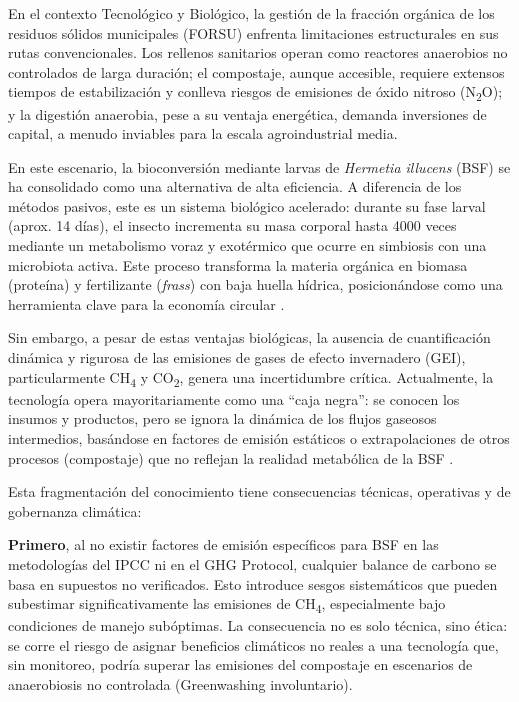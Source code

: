 En el contexto Tecnológico y Biológico, la gestión de la fracción orgánica de los residuos sólidos municipales (FORSU) enfrenta limitaciones estructurales en sus rutas convencionales. Los rellenos sanitarios operan como reactores anaerobios no controlados de larga duración; el compostaje, aunque accesible, requiere extensos tiempos de estabilización y conlleva riesgos de emisiones de óxido nitroso (N\textsubscript{2}O); y la digestión anaerobia, pese a su ventaja energética, demanda inversiones de capital, a menudo inviables para la escala agroindustrial media.

En este escenario, la bioconversión mediante larvas de \textit{Hermetia illucens} (BSF) se ha consolidado como una alternativa de alta eficiencia. A diferencia de los métodos pasivos, este es un sistema biológico acelerado: durante su fase larval (aprox. 14 días), el insecto incrementa su masa corporal hasta 4000 veces mediante un metabolismo voraz y exotérmico que ocurre en simbiosis con una microbiota activa. Este proceso transforma la materia orgánica en biomasa (proteína) y fertilizante (\textit{frass}) con baja huella hídrica, posicionándose como una herramienta clave para la economía circular \parencite{surendraBioconversionOrganicWastes2016,bermudez-serranoComprehensiveUtilizationBlack2023}.

Sin embargo, a pesar de estas ventajas biológicas, la ausencia de cuantificación dinámica y rigurosa de las emisiones de gases de efecto invernadero (GEI), particularmente CH\textsubscript{4} y CO\textsubscript{2}, genera una incertidumbre crítica. Actualmente, la tecnología opera mayoritariamente como una ``caja negra'': se conocen los insumos y productos, pero se ignora la dinámica de los flujos gaseosos intermedios, basándose en factores de emisión estáticos o extrapolaciones de otros procesos (compostaje) que no reflejan la realidad metabólica de la BSF \parencite{fuhrmannComprehensiveIndustryrelevantBlack2025a,rossiEstimatingDynamicsGreenhouse2024a}. 

Esta fragmentación del conocimiento tiene consecuencias técnicas, operativas y de gobernanza climática:

\textbf{Primero}, al no existir factores de emisión específicos para BSF en las metodologías del IPCC ni en el GHG Protocol, cualquier balance de carbono se basa en supuestos no verificados. Esto introduce sesgos sistemáticos que pueden subestimar significativamente las emisiones de CH\textsubscript{4}, especialmente bajo condiciones de manejo subóptimas. La consecuencia no es solo técnica, sino ética: se corre el riesgo de asignar beneficios climáticos no reales a una tecnología que, sin monitoreo, podría superar las emisiones del compostaje en escenarios de anaerobiosis no controlada (Greenwashing involuntario).

